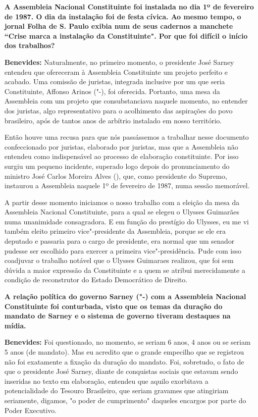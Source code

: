 \textbf{A Assembleia Nacional Constituinte foi instalada no dia 1º de
fevereiro de 1987. O dia da instalação foi de festa cívica. Ao mesmo
tempo, o jornal Folha de S. Paulo exibia num de seus cadernos a manchete
``Crise marca a instalação da Constituinte". Por que foi difícil o
início dos trabalhos?}

\textbf{Benevides:} Naturalmente, no primeiro momento, o presidente José
Sarney entendeu que ofereceram à Assembleia Constituinte um projeto
perfeito e acabado. Uma comissão de juristas, integrada inclusive por um
que seria Constituinte, Affonso Arinos ("-), foi oferecida.
Portanto, uma mesa da Assembleia com um projeto que consubstanciava
naquele momento, no entender dos juristas, algo representativo para o
acolhimento das aspirações do povo brasileiro, após de tantos anos de
arbítrio instalado em nosso território.

Então houve uma recusa para que nós passássemos a trabalhar nesse
documento confeccionado por juristas, elaborado por juristas, mas que a
Assembleia não entendeu como indispensável ao processo de elaboração
constituinte. Por isso surgiu um pequeno incidente, superado logo depois
do pronunciamento do ministro José Carlos Moreira Alves (), que, como
presidente do Supremo, instaurou a Assembleia naquele 1º de fevereiro de
1987, numa sessão memorável.

A partir desse momento iniciamos o nosso trabalho com a eleição da mesa
da Assembleia Nacional Constituinte, para a qual se elegeu o Ulysses
Guimarães numa unanimidade consagradora. E em função do prestígio do
Ulysses, eu me vi também eleito primeiro vice"-presidente da Assembleia,
porque se ele era deputado e passaria para o cargo de presidente, era
normal que um senador pudesse ser escolhido para exercer a primeira
vice"-presidência. Pude com isso coadjuvar o trabalho notável que o
Ulysses Guimaraes realizou, que foi sem dúvida a maior expressão da
Constituinte e a quem se atribui merecidamente a condição de
reconstrutor do Estado Democrático de Direito.

\textbf{A relação política do governo Sarney ("-) com a Assembleia
Nacional Constituinte foi conturbada, visto que os temas da duração do
mandato de Sarney e o sistema de governo tiveram destaques na mídia.}

\textbf{Benevides:} Foi questionado, no momento, se seriam 6 anos, 4
anos ou se seriam 5 anos (de mandato). Mas eu acredito que o grande
empecilho que se registrou não foi exatamente a fixação da duração do
mandato. Foi, sobretudo, o fato de que o presidente José Sarney, diante
de conquistas sociais que estavam sendo inseridas no texto em
elaboração, entendeu que aquilo exorbitava a potencialidade do Tesouro
Brasileiro, que seriam gravames que atingiriam seriamente, digamos, "o
poder de cumprimento" daqueles encargos por parte do Poder Executivo.

